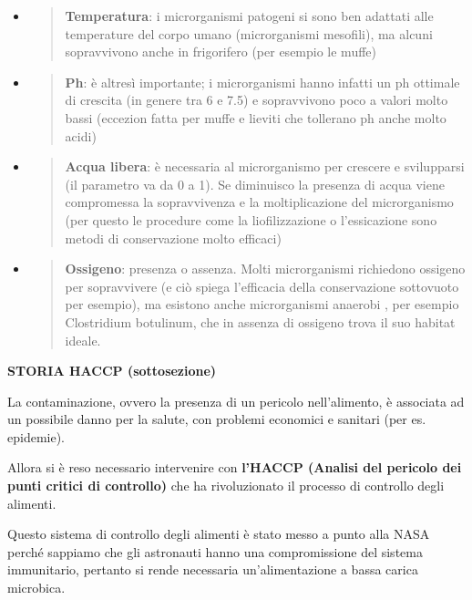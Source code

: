 \documentclass[]{article}
\begin{document}
\begin{itemize}
\item
  \begin{quote}
  \textbf{Temperatura}: i microrganismi patogeni si sono ben adattati
  alle temperature del corpo umano (microrganismi mesofili), ma alcuni
  sopravvivono anche in frigorifero (per esempio le muffe)
  \end{quote}
\item
  \begin{quote}
  \textbf{Ph}: è altresì importante; i microrganismi hanno infatti un ph
  ottimale di crescita (in genere tra 6 e 7.5) e sopravvivono poco a
  valori molto bassi (eccezion fatta per muffe e lieviti che tollerano
  ph anche molto acidi)
  \end{quote}
\item
  \begin{quote}
  \textbf{Acqua libera}: è necessaria al microrganismo per crescere e
  svilupparsi (il parametro va da 0 a 1). Se diminuisco la presenza di
  acqua viene compromessa la sopravvivenza e la moltiplicazione del
  microrganismo (per questo le procedure come la liofilizzazione o
  l'essicazione sono metodi di conservazione molto efficaci)
  \end{quote}
\item
  \begin{quote}
  \textbf{Ossigeno}: presenza o assenza. Molti microrganismi richiedono
  ossigeno per sopravvivere (e ciò spiega l'efficacia della
  conservazione sottovuoto per esempio), ma esistono anche microrganismi
  anaerobi , per esempio Clostridium botulinum, che in assenza di
  ossigeno trova il suo habitat ideale.
  \end{quote}
\end{itemize}

\textbf{STORIA HACCP (sottosezione)}

La contaminazione, ovvero la presenza di un pericolo nell'alimento, è
associata ad un possibile danno per la salute, con problemi economici e
sanitari (per es. epidemie).

Allora si è reso necessario intervenire con \textbf{l'HACCP (Analisi del
pericolo dei punti critici di controllo)} che ha rivoluzionato il
processo di controllo degli alimenti.

Questo sistema di controllo degli alimenti è stato messo a punto alla
NASA perché sappiamo che gli astronauti hanno una compromissione del
sistema immunitario, pertanto si rende necessaria un'alimentazione a
bassa carica microbica.
\end{document}
